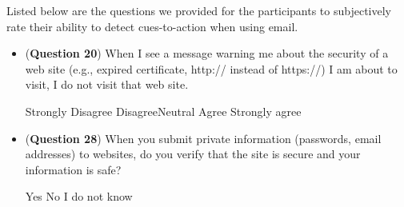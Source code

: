 Listed below are the questions we provided for the participants to  subjectively rate their ability to detect cues-to-action when using email.
\begin{itemize}
\item (\textbf{Question 20}) When I see a message warning me about the security of a web site (e.g., expired certificate, http:// instead of https://) I am about to visit, I do not visit that web site.
\par Strongly Disagree \hspace{1cm} Disagree\hspace{1cm}Neutral\hspace{1cm} Agree\hspace{1cm} Strongly agree
\item (\textbf{Question 28}) When you submit private information (passwords, email addresses) to websites, do you verify that the site is secure and your information is safe?
\par Yes \hspace{1cm} No \hspace{1cm} I do not know
\end{itemize}

